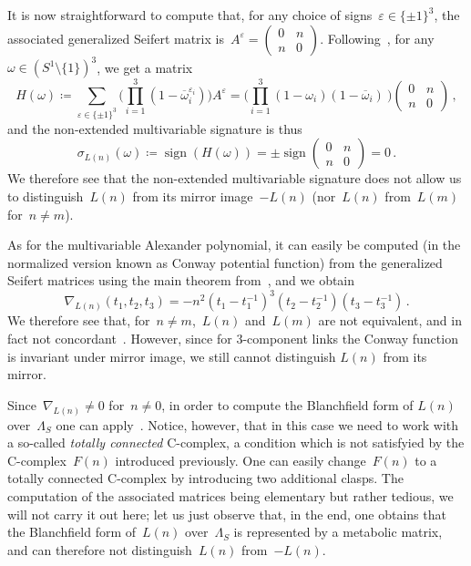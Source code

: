 \documentclass{amsart}
\newcommand{\sign}{\operatorname{sign}}
\newcommand{\om}{\omega}
\newcommand{\bom}{\overline{\omega}}
\theoremstyle{definition}
\theoremstyle{remark}
\begin{document}
It is now straightforward to compute that, for any choice of signs~$\varepsilon\in\{\pm 1\}^3$, the associated generalized Seifert matrix is~$A^\varepsilon = \begin{pmatrix} 0 & n \\ n & 0 \end{pmatrix}$. Following~\cite[Section~2]{CF08}, for any~$\omega\in (S^1\setminus\{1\})^3$, we get a matrix $$H(\omega)\coloneqq\sum_{\varepsilon\in\{\pm 1\}^3}\bigg(\prod_{i=1}^3(1-\overline{\omega}_i^{\varepsilon_i})\bigg)A^\varepsilon = \bigg(\prod_{i=1}^{3}(1-\omega_i)(1-\bom_i)~\bigg) \begin{pmatrix} 0 & n \\ n & 0 \end{pmatrix}\,,$$
and the non-extended multivariable signature is thus
$$\sigma_{L(n)}(\omega)\coloneqq\sign(H(\om)) = \pm \sign \begin{pmatrix} 0 & n \\ n & 0 \end{pmatrix} = 0\,.$$
We therefore see that the non-extended multivariable signature does not allow us to distinguish~$L(n)$ from its mirror image~$-L(n)$ (nor~$L(n)$ from~$L(m)$ for~$n\neq m$).

As for the multivariable Alexander polynomial, it can easily be computed (in the normalized version known as Conway potential function) from the generalized Seifert matrices using the main theorem from~\cite{Cim}, and we obtain
\[
\nabla_{L(n)} (t_1,t_2,t_3) = -n^2(t_1-t_1^{-1})^3(t_2-t_2^{-1})(t_3-t_3^{-1})\,.
\]
We therefore see that, for~$n\neq m$,~$L(n)$ and~$L(m)$ are not equivalent, and in fact not concordant~\cite{Kaw78}. However, since for $3$-component links the Conway function is invariant under mirror image, we still cannot distinguish $L(n)$ from its mirror.

Since~$\nabla_{L(n)}\neq 0$ for~$n\neq 0$, in order to compute the Blanchfield form of $L(n)$ over~$\Lambda_S$ one can apply~\cite[Theorem 1.2]{CFT}. Notice, however, that in this case we need to work with a so-called \emph{totally connected} C-complex, a condition which is not satisfyied by the C-complex~$F(n)$ introduced previously. One can easily change~$F(n)$ to a totally connected C-complex by introducing two additional clasps. The computation of the associated matrices being elementary but rather tedious, we will not carry it out here; let us just observe that, in the end, one obtains that the Blanchfield form of~$L(n)$ over~$\Lambda_S$ is represented by a metabolic matrix, and can therefore not distinguish~$L(n)$ from~$-L(n)$.
\end{document}
